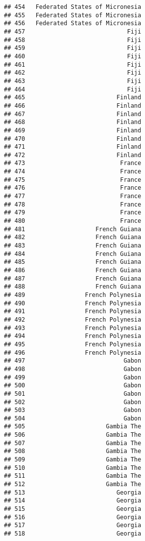 \documentclass[]{article}
\begin{document}
\begin{verbatim}
## 454   Federated States of Micronesia
## 455   Federated States of Micronesia
## 456   Federated States of Micronesia
## 457                             Fiji
## 458                             Fiji
## 459                             Fiji
## 460                             Fiji
## 461                             Fiji
## 462                             Fiji
## 463                             Fiji
## 464                             Fiji
## 465                          Finland
## 466                          Finland
## 467                          Finland
## 468                          Finland
## 469                          Finland
## 470                          Finland
## 471                          Finland
## 472                          Finland
## 473                           France
## 474                           France
## 475                           France
## 476                           France
## 477                           France
## 478                           France
## 479                           France
## 480                           France
## 481                    French Guiana
## 482                    French Guiana
## 483                    French Guiana
## 484                    French Guiana
## 485                    French Guiana
## 486                    French Guiana
## 487                    French Guiana
## 488                    French Guiana
## 489                 French Polynesia
## 490                 French Polynesia
## 491                 French Polynesia
## 492                 French Polynesia
## 493                 French Polynesia
## 494                 French Polynesia
## 495                 French Polynesia
## 496                 French Polynesia
## 497                            Gabon
## 498                            Gabon
## 499                            Gabon
## 500                            Gabon
## 501                            Gabon
## 502                            Gabon
## 503                            Gabon
## 504                            Gabon
## 505                       Gambia The
## 506                       Gambia The
## 507                       Gambia The
## 508                       Gambia The
## 509                       Gambia The
## 510                       Gambia The
## 511                       Gambia The
## 512                       Gambia The
## 513                          Georgia
## 514                          Georgia
## 515                          Georgia
## 516                          Georgia
## 517                          Georgia
## 518                          Georgia

\end{verbatim}
\end{document}
